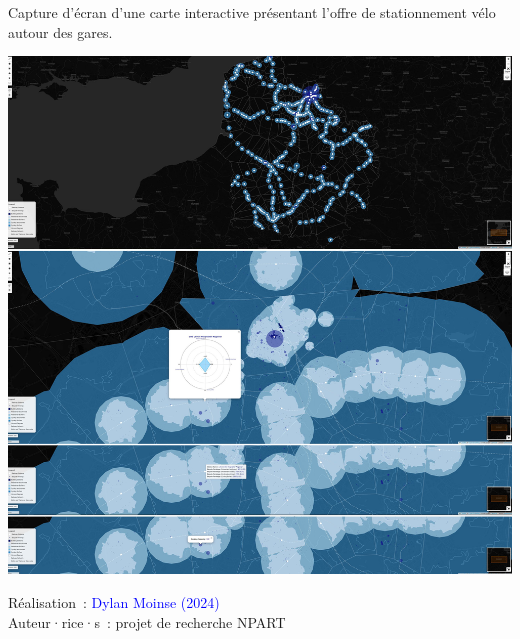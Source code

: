 \begin{refsegment}
    \begin{carte}[h!]\vspace*{4pt}
        \caption{Capture d'écran d'une carte interactive présentant l'offre de stationnement vélo autour des gares.}
        \label{fig-chap6:carte-interactive}
        \centerline{\includegraphics[width=1\columnwidth]{src/Figures/Chap-6/FR_EN_NPART_Carte_interactive.jpeg}}
        \vspace{5pt}
        \begin{flushright}\scriptsize{
        Réalisation~: \textcolor{blue}{Dylan Moinse (2024)}
        \\
        Auteur·rice·s~: projet de recherche \acrshort{NPART}
        }\end{flushright}
    \end{carte}



\end{refsegment}
